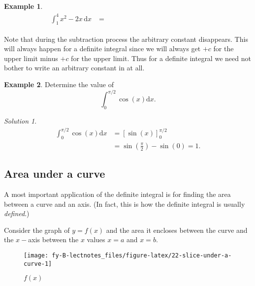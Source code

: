 \documentclass[
  11pt,
  oneside]{book}
\newcommand{\slide}{}
\theoremstyle{definition}
\theoremstyle{definition}
\newtheorem{example}{Example}[chapter]
\theoremstyle{definition}
\theoremstyle{definition}
\theoremstyle{remark}
\newtheorem*{solution}{Solution}
\begin{document}
\begin{slidesonly}

\slide

\begin{example}
\begin{align*}
\int_1^4 x^2-2x\,\mathrm{d}x& = \phantom{\left(\frac{4^3}{3}-4^2+C\right) - \left(\frac{1^3}{3}-1^2+C\right)}
\end{align*}
\end{example}

\vfill

\slide

\end{slidesonly}

Note that during the subtraction process the arbitrary constant disappears. This will always happen for a definite integral since we will always get \(+ c\) for the upper limit minus \(+ c\) for the upper limit. Thus for a definite integral we need not bother to write an arbitrary constant in at all.
\slide

\begin{example}
Determine the value of
\[
\int_0^{\pi/2}\cos(x)\mathrm{d}x.
\]
\end{example}

\begin{solution}
\begin{align*}
\int_0^{\pi/2}\cos(x)\mathrm{d}x& = \left[\sin(x)\right]_0^{\pi/2}\\
&=\sin\left(\frac{\pi}{2}\right)-\sin(0) = 1.
\end{align*}
\end{solution}

\slide

\subsection{Area under a curve}\label{area-under-a-curve}

A most important application of the definite integral is for finding the area between a curve and an axis. (In fact, this is how the definite integral is usually \emph{defined}.)

Consider the graph of \(y = f(x)\) and the area it encloses between the curve and the \(x-\)axis between the \(x\) values \(x = a\) and \(x = b\).

\begin{figure}

{\centering \texttt{[image: fy-B-lectnotes\_files/figure-latex/22-slice-under-a-curve-1]} 

}

\caption{$f(x)$}\label{fig:22-slice-under-a-curve}
\end{figure}
\end{document}
